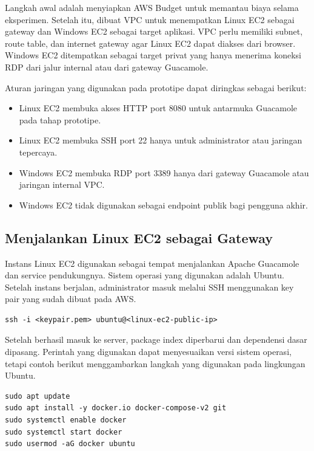 \documentclass[conference]{IEEEtran}
\begin{document}
Langkah awal adalah menyiapkan AWS Budget untuk memantau biaya selama eksperimen. Setelah itu, dibuat VPC untuk menempatkan Linux EC2 sebagai gateway dan Windows EC2 sebagai target aplikasi. VPC perlu memiliki subnet, route table, dan internet gateway agar Linux EC2 dapat diakses dari browser. Windows EC2 ditempatkan sebagai target privat yang hanya menerima koneksi RDP dari jalur internal atau dari gateway Guacamole.

Aturan jaringan yang digunakan pada prototipe dapat diringkas sebagai berikut:

\begin{itemize}
    \item Linux EC2 membuka akses HTTP port 8080 untuk antarmuka Guacamole pada tahap prototipe.
    \item Linux EC2 membuka SSH port 22 hanya untuk administrator atau jaringan tepercaya.
    \item Windows EC2 membuka RDP port 3389 hanya dari gateway Guacamole atau jaringan internal VPC.
    \item Windows EC2 tidak digunakan sebagai endpoint publik bagi pengguna akhir.
\end{itemize}

\subsection{Menjalankan Linux EC2 sebagai Gateway}

Instans Linux EC2 digunakan sebagai tempat menjalankan Apache Guacamole dan service pendukungnya. Sistem operasi yang digunakan adalah Ubuntu. Setelah instans berjalan, administrator masuk melalui SSH menggunakan key pair yang sudah dibuat pada AWS.

\begin{lstlisting}[style=code]
ssh -i <keypair.pem> ubuntu@<linux-ec2-public-ip>
\end{lstlisting}

Setelah berhasil masuk ke server, package index diperbarui dan dependensi dasar dipasang. Perintah yang digunakan dapat menyesuaikan versi sistem operasi, tetapi contoh berikut menggambarkan langkah yang digunakan pada lingkungan Ubuntu.

\begin{lstlisting}[style=code]
sudo apt update
sudo apt install -y docker.io docker-compose-v2 git
sudo systemctl enable docker
sudo systemctl start docker
sudo usermod -aG docker ubuntu
\end{lstlisting}
\end{document}
